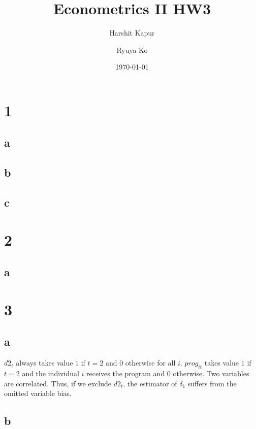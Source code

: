 \documentclass[11pt]{article}
\theoremstyle{definition}
\begin{document}
\title{Econometrics II HW3} %
\author[1]{Harshit Kapur}
\author[2]{Ryuya Ko}
\date{\today}

\maketitle

\pagebreak

\section*{1}

\subsection*{a}

\subsection*{b}

\subsection*{c}
\section*{2}
\subsection*{a}


\section*{3}
\subsection*{a}

$d2_t$ always takes value $1$ if $t = 2$ and $0$ otherwise for all $i$. $prog_{it}$ takes value $1$ if $t = 2$ and the individual $i$ receives the program and $0$ otherwise. Two variables are correlated. Thus, if we exclude $d2_t$, the estimator of $\delta_1$ suffers from the omitted variable bias.

\subsection*{b}
\end{document}
